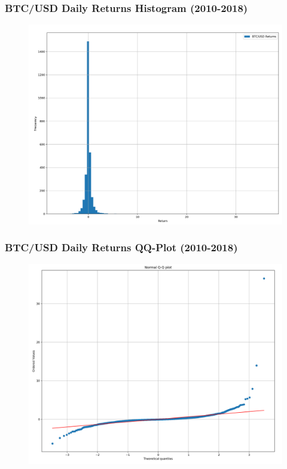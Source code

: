 \documentclass{beamer}
\begin{document}
\begin{frame}
\frametitle{BTC/USD Daily Returns Histogram (2010-2018)}
\begin{figure}[h!]
\centering 
\includegraphics[width=\textwidth]{btc_returns_hist.png}
\end{figure}
\end{frame}

\begin{frame}
\frametitle{BTC/USD Daily Returns QQ-Plot (2010-2018)}
\begin{figure}[h!]
\centering 
\includegraphics[width=\textwidth]{btc_returns_qqplot.png}
\end{figure}
\end{frame}
\end{document}

